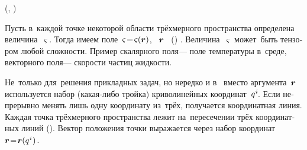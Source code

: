\begin{otherlanguage}{russian}
\end{otherlanguage}



\label{para:spatialdifferentiationoftensorfields}

\begin{changemargin}{\parindent}{\parindent}
\vspace{-0.1em}
\small \flushright
\textit{}\ru{\:---} \ru{,}  (, )
\par\vspace{.3em}
\end{changemargin}

\begin{otherlanguage}{russian}

\noindent
Пусть в~каждой точке некоторой области трёхмерного пространства определена величина~$\varsigma$.
Тогда имеем поле~${\varsigma \!=\! \varsigma(\bm{r})}$, ~$\bm{r}$\ru{\:---} ~()  .
Величина~$\varsigma$ может~быть тензором любой сложности.
Пример скалярного поля\:--- поле температуры в~среде, векторного поля\:--- скорости частиц жидкости.

\end{otherlanguage}



\begin{otherlanguage}{russian}

Не~только для~решения прикладных задач, но нередко и в~ вместо аргумента~$\bm{r}$ ис\-поль\-зу\-ет\-ся набор (какая-либо трой\-ка) криво\-линей\-ных координат~${q^{\hspace{.1ex}i}\hspace{-0.2ex}}$.
Если непрерывно менять лишь одну координату из~трёх, получается координатная линия.
Каждая точка трёхмерного пространства лежит на~пересечении трёх координатных линий ().
Вектор положения точки выражается через набор координат   ${\bm{r} \hspace{-0.4ex} = \hspace{-0.4ex} \bm{r}(q^{\hspace{.1ex}i}\hspace{.1ex})}$.

\end{otherlanguage}

